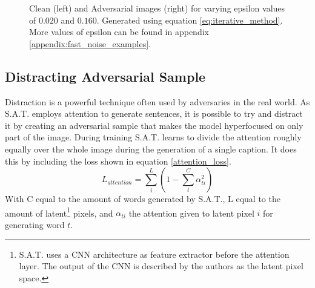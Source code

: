\begin{figure}
    \centering
    \vspace{\floatsep}
    \caption{Clean (left) and Adversarial images (right) for varying epsilon values of $0.020$ and $0.160$. Generated using equation \ref{eq:iterative_method}. More values of epsilon can be found in appendix \ref{appendix:fast_noise_examples}.}
    \label{fig:iterative_noise_examples}
\end{figure}


\subsection*{Distracting Adversarial Sample}
Distraction is a powerful technique often used by adversaries in the real world. As S.A.T. employs attention to generate sentences, it is possible to try and distract it by creating an adversarial sample that makes the model hyperfocused on only part of the image. During training S.A.T. learns to divide the attention roughly equally over the whole image during the generation of a single caption. It does this by including the loss shown in equation \ref{attention_loss}.
\begin{equation}
    L_{attention} = \sum^{L}_i (1 - \sum^{C}_{t} \alpha_{ti}^2)
    \label{attention_loss}
\end{equation}
\noindent With C equal to the amount of words generated by S.A.T., L equal to the amount of latent\footnote{S.A.T. uses a CNN architecture as feature extractor before the attention layer. The output of the CNN is described by the authors as the latent pixel space.} pixels, and $\alpha_{ti}$ the attention given to latent pixel $i$ for generating word $t$.

